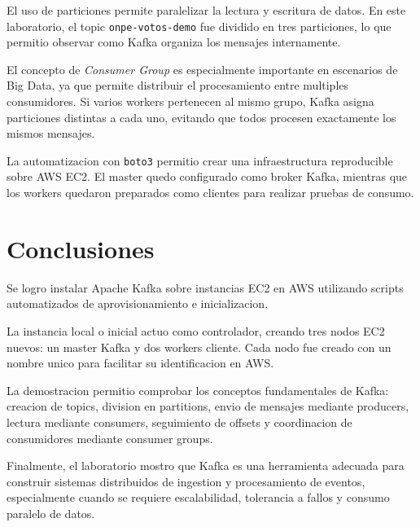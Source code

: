 \documentclass{practicaEPCC}
\begin{document}
El uso de particiones permite paralelizar la lectura y escritura de datos. En este laboratorio, el topic \texttt{onpe-votos-demo} fue dividido en tres particiones, lo que permitio observar como Kafka organiza los mensajes internamente.

El concepto de \textit{Consumer Group} es especialmente importante en escenarios de Big Data, ya que permite distribuir el procesamiento entre multiples consumidores. Si varios workers pertenecen al mismo grupo, Kafka asigna particiones distintas a cada uno, evitando que todos procesen exactamente los mismos mensajes.

La automatizacion con \texttt{boto3} permitio crear una infraestructura reproducible sobre AWS EC2. El master quedo configurado como broker Kafka, mientras que los workers quedaron preparados como clientes para realizar pruebas de consumo.

\section{Conclusiones}

Se logro instalar Apache Kafka sobre instancias EC2 en AWS utilizando scripts automatizados de aprovisionamiento e inicializacion.

La instancia local o inicial actuo como controlador, creando tres nodos EC2 nuevos: un master Kafka y dos workers cliente. Cada nodo fue creado con un nombre unico para facilitar su identificacion en AWS.

La demostracion permitio comprobar los conceptos fundamentales de Kafka: creacion de topics, division en partitions, envio de mensajes mediante producers, lectura mediante consumers, seguimiento de offsets y coordinacion de consumidores mediante consumer groups.

Finalmente, el laboratorio mostro que Kafka es una herramienta adecuada para construir sistemas distribuidos de ingestion y procesamiento de eventos, especialmente cuando se requiere escalabilidad, tolerancia a fallos y consumo paralelo de datos.
\end{document}
